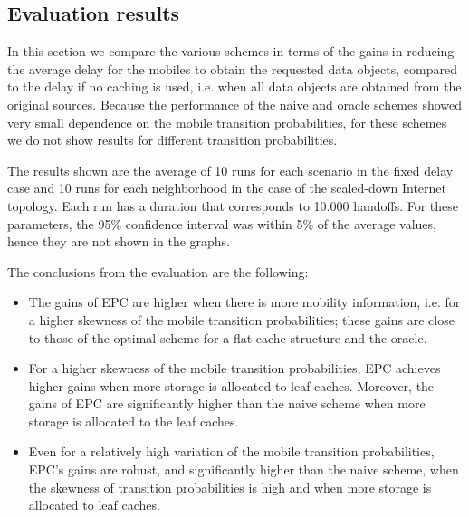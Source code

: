 \documentclass[conference]{IEEEtran}
\newcommand{\mynote}[1]{{{\medskip
\footnotesize \em \noindent Note: #1}}\medskip}
\newcommand{\mynotex}[1]{}
\renewcommand{\mynote}[1]{}
\begin{document}
\mynote{TODO:
\begin{itemize}
\item XV: actual value for X.X.
\end{itemize}
}

\mynotex{TODO:
\begin{itemize}
\item Possibly add reference about number of hops, to motivate the ratios 
\end{itemize}
}

\vspace{-0.05in}
\subsection{Evaluation results}
\vspace{-0.05in}

In this section we compare the various schemes in terms of the gains in reducing the average delay for the mobiles to obtain the requested data objects, compared to the delay if no caching is used, i.e. when all data objects are obtained from the original sources.
Because the performance of the naive and oracle schemes showed very small dependence on the mobile transition probabilities, for these schemes we do not show results for different transition probabilities.

The results shown  are the average of 10 runs for each scenario in the fixed delay case and 10 runs for each neighborhood in the case of the scaled-down Internet topology. Each run has a duration that corresponds to 10.000 handoffs. For these parameters, the 95\% confidence interval was within 5\% of the average values,  hence they are not shown in  the graphs.

\mynote{XV: Check stand. dev. for variable delay.}

The  conclusions from the evaluation are the following:
\begin{itemize}
\item The gains of EPC  are higher when there is more mobility information, i.e. for a higher skewness of the mobile transition probabilities; these gains are close to those of the optimal scheme for a flat cache structure and the oracle.
\item For a higher skewness of the mobile transition probabilities,  EPC achieves higher gains when  more storage is allocated to  leaf caches. Moreover, the gains of  EPC are significantly higher than the naive scheme when more storage is allocated to the leaf caches.
\item Even for a relatively high variation of the mobile transition probabilities, EPC's gains are robust, and  significantly higher  than the naive scheme, when the  skewness of transition probabilities is high and when more storage is allocated to leaf caches.
\end{itemize}
\end{document}
